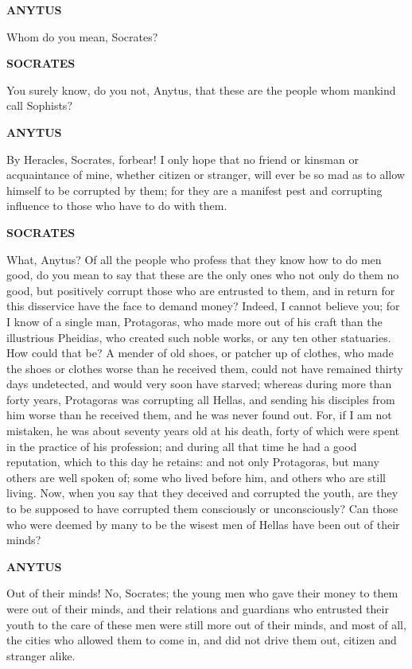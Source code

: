 \documentclass[11pt,letter]{article}
\begin{document}
\par \textbf{ANYTUS}
\par   Whom do you mean, Socrates?

\par \textbf{SOCRATES}
\par   You surely know, do you not, Anytus, that these are the people whom mankind call Sophists?

\par \textbf{ANYTUS}
\par   By Heracles, Socrates, forbear! I only hope that no friend or kinsman or acquaintance of mine, whether citizen or stranger, will ever be so mad as to allow himself to be corrupted by them; for they are a manifest pest and corrupting influence to those who have to do with them.

\par \textbf{SOCRATES}
\par   What, Anytus? Of all the people who profess that they know how to do men good, do you mean to say that these are the only ones who not only do them no good, but positively corrupt those who are entrusted to them, and in return for this disservice have the face to demand money? Indeed, I cannot believe you; for I know of a single man, Protagoras, who made more out of his craft than the illustrious Pheidias, who created such noble works, or any ten other statuaries. How could that be? A mender of old shoes, or patcher up of clothes, who made the shoes or clothes worse than he received them, could not have remained thirty days undetected, and would very soon have starved; whereas during more than forty years, Protagoras was corrupting all Hellas, and sending his disciples from him worse than he received them, and he was never found out. For, if I am not mistaken, he was about seventy years old at his death, forty of which were spent in the practice of his profession; and during all that time he had a good reputation, which to this day he retains:  and not only Protagoras, but many others are well spoken of; some who lived before him, and others who are still living. Now, when you say that they deceived and corrupted the youth, are they to be supposed to have corrupted them consciously or unconsciously? Can those who were deemed by many to be the wisest men of Hellas have been out of their minds?

\par \textbf{ANYTUS}
\par   Out of their minds! No, Socrates; the young men who gave their money to them were out of their minds, and their relations and guardians who entrusted their youth to the care of these men were still more out of their minds, and most of all, the cities who allowed them to come in, and did not drive them out, citizen and stranger alike.
\end{document}
